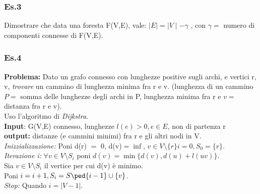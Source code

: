 \subsubsection{Es.3}
Dimostrare che data una foresta F(V,E), vale: \(\mid E \mid = \mid V \mid - \gamma \) , con $\gamma =$ numero di componenti connesse di F(V,E).

\subsubsection{Es.4}
\textbf{Problema:} Dato un grafo connesso con lunghezze positive sugli archi, e vertici r, v,
\emph{trovare} un cammino di lunghezza minima fra r e v. (lunghezza di un cammino $P =$ somma delle
lunghezze degli archi in P, lunghezza minima fra r e $v=$ distanza fra r e v). \\
Uso l'algoritmo di \emph{Dijkstra}. \\
\textbf{Input}: G(V,E) connesso, lunghezze \(l(e) > 0, e \in E\), non di partenza r \\
\textbf{output:} distanze (e cammini minimi) fra r e gli altri nodi in V.\\
\emph{Inizzializzazione:} Poni d(r) $=$ 0, d(v)$= \inf$, \(v \in V \setminus \{r \} i= 0, S_0 = \{r \}\). \\
\emph{Iterazione i:} \(\forall v \in V \setminus S_i\) poni \(d(v)= \min \{ d(v), d(u)+l(uv) \}\). \\
Sia $v \in V \setminus S_i$ il vertice per cui d(v) è minimo. \\
Poni \(i=i +1, S_i=S\ped{i-1} \cup \{ v\}\). \\
\emph{Stop:} Quando $i= |V-1|$.


\newpage
